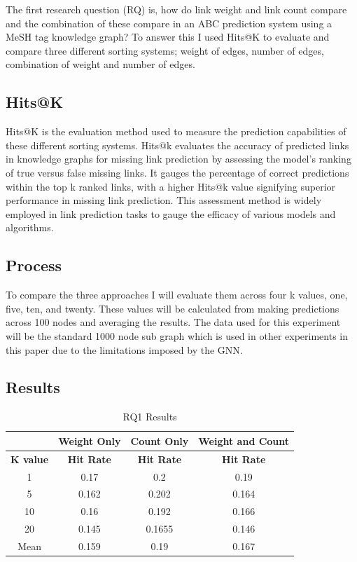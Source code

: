\documentclass{l4proj}
\begin{document}
The first research question (RQ) is, how do link weight and link count compare and the combination of these compare in an ABC prediction system using a MeSH tag knowledge graph? To answer this I used Hits@K to evaluate and compare three different sorting systems; weight of edges, number of edges, combination of weight and number of edges. \\

\subsection{Hits@K}

Hits@K is the evaluation method used to measure the prediction capabilities of these different sorting systems. Hits@k evaluates the accuracy of predicted links in knowledge graphs for missing link prediction by assessing the model's ranking of true versus false missing links. It gauges the percentage of correct predictions within the top k ranked links, with a higher Hits@k value signifying superior performance in missing link prediction. This assessment method is widely employed in link prediction tasks to gauge the efficacy of various models and algorithms. \\

\subsection{Process}

To compare the three approaches I will evaluate them across four k values, one, five, ten, and twenty. These values will be calculated from making predictions across 100 nodes and averaging the results. The data used for this experiment will be the standard 1000 node sub graph which is used in other experiments in this paper due to the limitations imposed by the GNN.\\

\subsection{Results}

\begin{table}[h]
    \centering
    \caption{RQ1 Results}
    \label{tab:rq1_results}
    \begin{tabular}{|c|c|c|c|}
    \hline
    & \textbf{Weight Only} & \textbf{Count Only} &\textbf{Weight and Count} \\ \hline
    \textbf{K value} & \textbf{Hit Rate} & \textbf{Hit Rate} & \textbf{Hit Rate}\\ \hline
    1 & 0.17 & 0.2 & 0.19 \\ \hline
    5 & 0.162 & 0.202 & 0.164\\ \hline
    10 & 0.16 & 0.192 & 0.166 \\ \hline
    20 & 0.145 &0.1655 & 0.146\\ \hline
    Mean & 0.159 & 0.19 & 0.167 \\ \hline
    \end{tabular}
\end{table}
\end{document}
